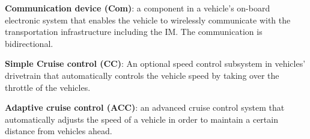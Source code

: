 \begin{small_ind_s_itemize}

\item \textbf{Communication device (Com)}:
a component in a vehicle's on-board electronic system that enables the
vehicle to wirelessly communicate with the transportation
infrastructure including the IM. The communication is bidirectional.

\item \textbf{Simple Cruise control (CC)}:
An optional speed control subsystem in vehicles' drivetrain that
automatically controls the vehicle speed by taking over the throttle
of the vehicles.

\item \textbf{Adaptive cruise control (ACC)}:
an advanced cruise control system that automatically adjusts the speed
of a vehicle in order to maintain a certain distance from vehicles
ahead.









\end{small_ind_s_itemize}

